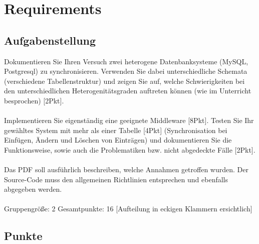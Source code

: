 \documentclass[11pt, a4paper]{article}
\begin{document}
\section{Requirements}

\subsection{Aufgabenstellung}
Dokumentieren Sie Ihren Versuch zwei heterogene Datenbanksysteme (MySQL, Postgresql) zu synchronisieren. Verwenden Sie dabei unterschiedliche Schemata (verschiedene Tabellenstruktur) und zeigen Sie auf, welche Schwierigkeiten bei den unterschiedlichen Heterogenitätsgraden auftreten können (wie im Unterricht besprochen) [2Pkt].
\\\\
Implementieren Sie eigenständig eine geeignete Middleware [8Pkt]. Testen Sie Ihr gewähltes System mit mehr als einer Tabelle [4Pkt] (Synchronisation bei Einfügen, Ändern und Löschen von Einträgen) und dokumentieren Sie die Funktionsweise, sowie auch die Problematiken bzw. nicht abgedeckte Fälle [2Pkt].
\\\\
Das PDF soll ausführlich beschreiben, welche Annahmen getroffen wurden. Der Source-Code muss den allgemeinen Richtlinien entsprechen und ebenfalls abgegeben werden.
\\\\
Gruppengröße: 2
Gesamtpunkte: 16 [Aufteilung in eckigen Klammern ersichtlich]

\subsection{Punkte}
\end{document}

